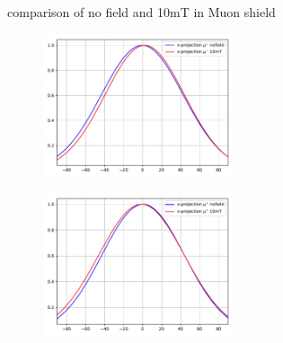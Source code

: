 \begin{frame}[t]{comparison of no field and 10mT in Muon shield}
  \begin{multicols}{2}
    \begin{figure}
      \centering
      \includegraphics[width=0.5\textwidth]{../hists/nofield/comp/gauss_comparison_x-_10mT.pdf}
    \end{figure}
    \columnbreak
    \begin{figure}
      \centering
      \includegraphics[width=0.5\textwidth]{../hists/nofield/comp/gauss_comparison_x+_10mT.pdf}
    \end{figure}
  \end{multicols}
\end{frame}

